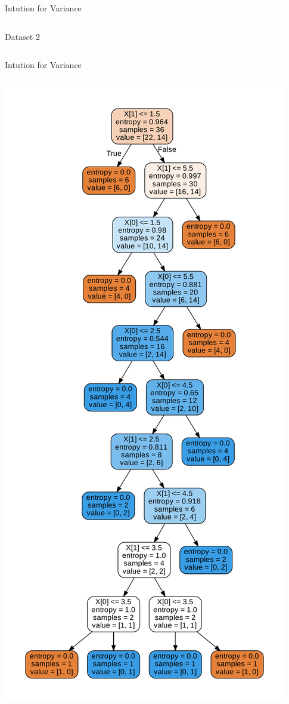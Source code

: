 \documentclass{beamer}
\begin{document}
\begin{frame}{Intution for Variance}
\begin{columns}
\begin{column}{0.5\textwidth}{\hspace{1.75cm} Dataset 2}
\begin{center}
			\end{center}
		\end{column}
	\end{columns}
	\end{frame}


	\begin{frame}{Intution for Variance}
	\begin{columns}
		\begin{column}{0.5\textwidth}
			\begin{center}
			\includegraphics[scale=0.2]{var_1}

\end{center}
\end{column}
\end{columns}
\end{frame}
\end{document}
